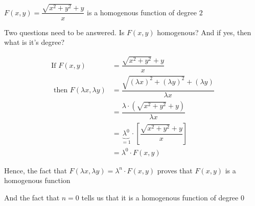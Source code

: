 \documentclass[14pt,fleqn]{extarticle}
\newcommand\fx{\dfrac{\sqrt{x^2+y^2}+y}{x}}
\newcommand\lfx{\dfrac{\sqrt{\left(\lambda x \right)^2  + \left(\lambda y \right)^2} + \left(\lambda y \right)}{\lambda x}}
\begin{document}
 
\begin{snippet}
    
    \incorrect
    
    $F(x,y) = \fx$ is a homogenous function of degree $2$     
    
    \reason
    
    Two questions need to be answered. Is $F(x,y)$ homogenous? And if yes, then what 
    is it's degree? \newline 
    
    \begin{align}
    \text{If }F(x,y) &= \fx \\
    \text{ then } F \left(\lambda x, \lambda y \right) &= \lfx \\
    &= \dfrac{\lambda\cdot \left(\sqrt{x^2 + y^2} + y\right)}{\lambda x} \\
    &= \underbrace{\lambda^0}_{=1}\cdot \left[\fx \right] \\
    &= \lambda^0 \cdot F(x,y) 
\end{align}

Hence, the fact that $F(\lambda x, \lambda y) = \lambda^n\cdot F(x,y)$ proves 
that $F(x,y)$ is a homogenous function \newline 

And the fact that $n = 0$ tells us that it is a homogenous function of degree $0$ 
    
\end{snippet} 
\end{document}
